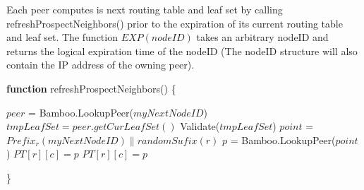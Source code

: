 \begin{algorithm} \label{alg:prospect}
\caption{Each peer computes is next routing table and leaf set by calling refreshProspectNeighbors()
prior to the expiration of its current routing table and leaf set. The function $EXP(nodeID)$ takes an 
arbitrary nodeID and returns the logical expiration time of the nodeID (The nodeID structure will also
contain the IP address of the owning peer).}
\textbf{function} refreshProspectNeighbors() \{
\begin{algorithmic}[1]
\small
\STATE $peer$ = Bamboo.LookupPeer($myNextNodeID$)
\STATE $tmpLeafSet = peer.getCurLeafSet()$
\STATE Validate($tmpLeafSet$)
	\ENDIF
\ENDFOR
\STATE
{}
		\STATE $point$ = \\ $Prefix_r(myNextNodeID) \| randomSufix(r)$
		\STATE $p$ = Bamboo.LookupPeer($point$)
			\STATE $PT[r][c] = p$
			\STATE $PT[r][c] = p$
		\ENDIF
	\ENDFOR
\ENDFOR 
\end{algorithmic}
\}
\end{algorithm}